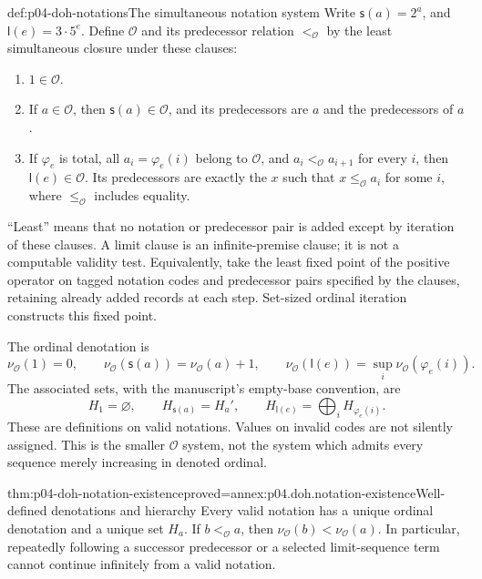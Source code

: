 \begin{hbdefinition}{def:p04-doh-notations}{The simultaneous notation system}
Write \(\mathsf s(a)=2^a\), and \(\mathsf l(e)=3\cdot5^e\).
Define \(\mathcal O\) and its predecessor relation \(<_{\mathcal O}\)
by the least simultaneous closure under these clauses:
\begin{enumerate}
 \item \(1\in\mathcal O\).
 \item If \(a\in\mathcal O\), then \(\mathsf s(a)\in\mathcal O\),
 and its predecessors are \(a\) and the predecessors of \(a\).
 \item If \(\varphi_e\) is total, all \(a_i=\varphi_e(i)\) belong to
 \(\mathcal O\), and \(a_i<_{\mathcal O}a_{i+1}\) for every \(i\),
 then \(\mathsf l(e)\in\mathcal O\). Its predecessors are exactly the
 \(x\) such that \(x\leq_{\mathcal O}a_i\) for some \(i\), where
 \(\leq_{\mathcal O}\) includes equality.
\end{enumerate}
``Least'' means that no notation or predecessor pair is added except by
iteration of these clauses. A limit clause is an infinite-premise clause;
it is not a computable validity test. Equivalently, take the least fixed
point of the positive operator on tagged notation codes and predecessor
pairs specified by the clauses, retaining already added records at each
step. Set-sized ordinal iteration constructs this fixed point.

The ordinal denotation is
\[
 \nu_{\mathcal O}(1)=0,\qquad
 \nu_{\mathcal O}(\mathsf s(a))=\nu_{\mathcal O}(a)+1,\qquad
 \nu_{\mathcal O}(\mathsf l(e))=\sup_i\nu_{\mathcal O}(\varphi_e(i)).
\]
The associated sets, with the manuscript's empty-base convention, are
\[
 H_1=\varnothing,\qquad H_{\mathsf s(a)}=H_a',\qquad
 H_{\mathsf l(e)}=\bigoplus_i H_{\varphi_e(i)}.
\]
These are definitions on valid notations. Values on invalid codes are not
silently assigned. This is the smaller \(\mathcal O\) system, not the
system which admits every sequence merely increasing in denoted ordinal.
\end{hbdefinition}

\begin{hblemma}{thm:p04-doh-notation-existence}{proved=annex:p04.doh.notation-existence}{Well-defined denotations and hierarchy}
Every valid notation has a unique ordinal denotation and a unique set
\(H_a\). If \(b<_{\mathcal O}a\), then
\(\nu_{\mathcal O}(b)<\nu_{\mathcal O}(a)\).
In particular, repeatedly following a successor predecessor or a selected
limit-sequence term cannot continue infinitely from a valid notation.
\end{hblemma}

